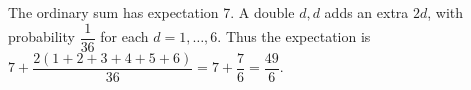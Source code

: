 The ordinary sum has expectation 7. A double $d,d$ adds an extra $2d$, with probability $\dfrac{1}{36}$ for each $d=1,\ldots,6$. Thus the expectation is $7+\dfrac{2(1+2+3+4+5+6)}{36}=7+\dfrac{7}{6}=\boxed{\dfrac{49}{6}}$.
